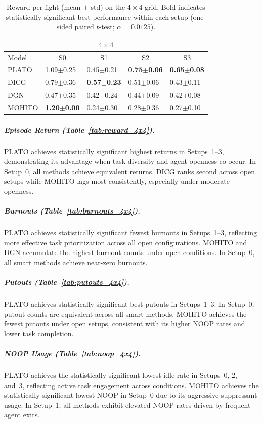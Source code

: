 \begin{table}[t]
\centering
\small
\setlength{\tabcolsep}{2.5pt}
\renewcommand{\arraystretch}{1.03}
\begin{tabular}{l|l|l|l|l}
\toprule
\multicolumn{5}{c}{$4\times 4$} \\
\midrule
Model & \multicolumn{1}{c|}{S0} & \multicolumn{1}{c|}{S1} & \multicolumn{1}{c|}{S2} & \multicolumn{1}{c}{S3} \\
\midrule
PLATO & 1.09$\pm$0.25 & 0.45$\pm$0.21 & \textbf{0.75$\pm$0.06} & \textbf{0.65$\pm$0.08} \\
DICG & 0.79$\pm$0.36 & \textbf{0.57$\pm$0.23} & 0.51$\pm$0.06 & 0.43$\pm$0.11 \\
DGN & 0.47$\pm$0.35 & 0.42$\pm$0.24 & 0.44$\pm$0.09 & 0.42$\pm$0.08 \\
MOHITO  & \textbf{1.20$\pm$0.00} & 0.24$\pm$0.30 & 0.28$\pm$0.36 & 0.27$\pm$0.10 \\
\bottomrule
\end{tabular}
\caption{Reward per fight (mean $\pm$ std) on the $4\times 4$ grid. Bold indicates statistically significant best performance within each setup (one-sided paired $t$-test; $\alpha=0.0125$).}
\label{tab:rpf_4x4}
\end{table}



\subparagraph{Episode Return (Table~\ref{tab:reward_4x4}).}
PLATO achieves statistically significant highest returns in Setups~1--3, demonstrating its advantage when task diversity and agent openness co-occur. In Setup~0, all methods achieve equivalent returns. DICG ranks second across open setups while MOHITO lags most consistently, especially under moderate openness.

\subparagraph{Burnouts (Table~\ref{tab:burnouts_4x4}).}
PLATO achieves statistically significant fewest burnouts in Setups~1--3, reflecting more effective task prioritization across all open configurations. MOHITO and DGN accumulate the highest burnout counts under open conditions. In Setup~0, all smart methods achieve near-zero burnouts.

\subparagraph{Putouts (Table~\ref{tab:putouts_4x4}).}
PLATO achieves statistically significant best putouts in Setups~1--3. In Setup~0, putout counts are equivalent across all smart methods. MOHITO achieves the fewest putouts under open setups, consistent with its higher NOOP rates and lower task completion.

\subparagraph{NOOP Usage (Table~\ref{tab:noop_4x4}).}
PLATO achieves the statistically significant lowest idle rate in Setups~0, 2, and~3, reflecting active task engagement across conditions. MOHITO achieves the statistically significant lowest NOOP in Setup~0 due to its aggressive suppressant usage. In Setup~1, all methods exhibit elevated NOOP rates driven by frequent agent exits.

